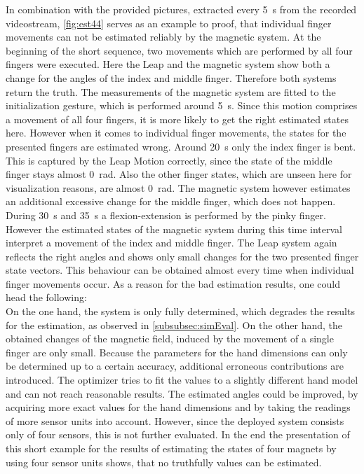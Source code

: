 In combination with the provided pictures, extracted every \SI{5}{\second} from the recorded videostream, \ref{fig:est44} serves as an example to proof, that individual finger movements can not be estimated reliably by the magnetic system. At the beginning of the short sequence, two movements which are performed by all four fingers were executed. Here the Leap and the magnetic system show both a change for the angles of the index and middle finger. Therefore both systems return the truth. The measurements of the magnetic system are fitted to the initialization gesture, which is performed around \SI{5}{\second}. Since this motion comprises a movement of all four fingers, it is more likely to get the right estimated states here. However when it comes to individual finger movements, the states for the presented fingers are estimated wrong. Around \SI{20}{\second} only the index finger is bent. This is captured by the Leap Motion correctly, since the state of the middle finger stays almost \SI{0}{\radian}. Also the other finger states, which are unseen here for visualization reasons, are almost \SI{0}{\radian}. The magnetic system however estimates an additional excessive change for the middle finger, which does not happen. During \SI{30}{\second} and \SI{35}{\second} a flexion-extension is performed by the pinky finger. However the estimated states of the magnetic system during this time interval interpret a movement of the index and middle finger. The Leap system again reflects the right angles and shows only small changes for the two presented finger state vectors. This behaviour can be obtained almost every time when individual finger movements occur. As a reason for the bad estimation results, one could head the following:\\ 
On the one hand, the system is only fully determined, which degrades the results for the estimation, as observed in \ref{subsubsec:simEval}. On the other hand, the obtained changes of the magnetic field, induced by the movement of a single finger are only small. Because the parameters for the hand dimensions can only be determined up to a certain accuracy, additional erroneous contributions are introduced. The optimizer tries to fit the values to a slightly different hand model and can not reach reasonable results. The estimated angles could be improved, by acquiring more exact values for the hand dimensions and by taking the readings of more sensor units into account. However, since the deployed system consists only of four sensors, this is not further evaluated. In the end the presentation of this short example for the results of estimating the states of four magnets by using four sensor units shows, that no truthfully values can be estimated.

